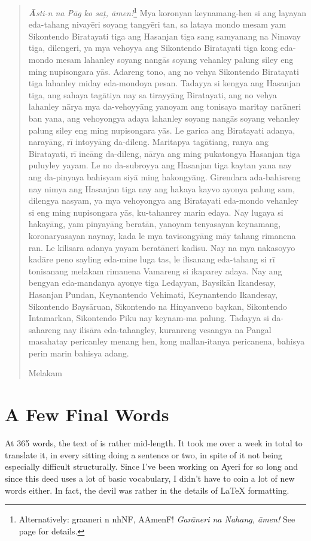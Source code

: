 \documentclass[12pt,paper=a4]{scrartcl}
\newcommand{\fw}[1]{\textit{#1}} %
\newcommand{\ayr}[1]{{\Tagati #1}}
\begin{document}
\begin{quotation}
	\fw{\textbf{Ā}sti-n na Pāg ko saț, āmen!}\footnote{Alternatively:
		\ayr{graaneri n nhNF, AAmenF!} \fw{Garāneri na Nahang, āmen!}
		See page \pageref{ex:innomine} for details.} %
	Mya koronyan keynamang-hen si ang layayan eda-tahang nivayēri soyang 
		tangyēri tan, sa lataya mondo mesam yam Sikontendo Biratayati 
		tiga ang Hasanjan tiga sang samyanang na Nina\-vay tiga, 
		dilengeri, ya mya vehoyya ang Sikontendo Biratayati tiga kong 
		eda-mondo mesam lahanley soyang nangās soyang vehanley palung 
		siley eng ming nupisongara yās. %
	Adareng tono, ang no vehya Sikontendo Birata\-yati tiga lahanley miday 
		eda-mondoya pesan. %
	Tadayya si kengya ang Hasanjan tiga, ang sahaya tagātiya nay sa 
		tirayyāng Birata\-yati, ang no vehya lahanley nārya mya 
		da-vehoyyāng yanoyam ang tonisaya maritay narāneri ban yana, ang 
		vehoyongya adaya lahanley soyang nangās soyang vehanley palung 
		siley eng ming nupisongara yās. %
	Le garica ang Biratayati adanya, narayāng, rī intoyyāng da-dileng. %
	Maritapya tagātiang, ranya ang Biratayati, rī incāng da-dileng, 
		nārya ang ming pukatongya Hasanjan tiga puluyley yayam. %
	Le no da-subroyya ang Hasanjan tiga kaytan yana nay ang da-pinyaya 
		bahisyam siyā ming hakongyāng. %
	Girendara ada-bahisreng nay nimya ang Hasanjan tiga nay ang hakaya kayvo 
		ayonya palung sam, dilengya nasyam, ya mya vehoyongya ang 
		Biratayati eda-mondo vehanley si eng ming nupisongara yās, 
		ku-tahanrey marin edaya. %
	Nay lugaya si hakayāng, yam pinyayāng beratān, yanoyam 
		tenyasayan keynamang, koronaryasayan naynay, kada le mya 
		tavisongyāng māy tahang rimanena ran. %
	Le kilisara adanya yayam beratāneri kadisu. %
	Nay na mya nakasoyyo kadāre peno sayling eda-mine luga tas, le ilisanang 
		eda-tahang si rī tonisanang melakam rimanena Vamareng si 
		ikaparey adaya. %
	Nay ang bengyan eda-mandanya ayonye tiga Ledayyan, Baysikān Ikandesay, 
		Hasanjan Pundan, Keynantendo Vehimati, Keynantendo Ikandesay, 
		Sikontendo Baysāruan, Sikontendo na Hinyanveno baykan, 
		Sikontendo Intamarkan, Sikontendo Piku nay keynam-ma palung. %
	Tadayya si da-sahareng nay ilisāra eda-tahangley, kuranreng vesangya na 
		Pangal masahatay pericanley menang hen, kong mallan-itanya 
		pericanena, bahisya perin marin bahisya adang. %
	\begin{center}
		Melakam
	\end{center}
\end{quotation}

\section{A Few Final Words}
At 365 words, the text of  is rather mid-length. It took 
me over a week in total to translate it, in every sitting doing a sentence or 
two, in spite of it not being especially difficult structurally. Since I've been 
working on Ayeri for so long and since this deed uses a lot of basic vocabulary, 
I didn't have to coin a lot of new words either. In fact, the devil was rather 
in the details of \LaTeX{} formatting.
\end{document}
